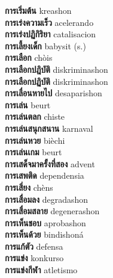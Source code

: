 \textbf{ การเริ่มต้น  } kreashon \\
\textbf{ การเร่งความเร็ว  } acelerando \\
\textbf{ การเร่งปฏิกิริยา  } catalisacion \\
\textbf{ การเลี้ยงเด็ก  } babysit (s.) \\
\textbf{ การเลือก  } chòis \\
\textbf{ การเลือกปฎิบัติ  } diskriminashon \\
\textbf{ การเลือกปฏิบัติ  } diskriminashon \\
\textbf{ การเลื่อนหายไป  } desaparishon \\
\textbf{ การเล่น  } beurt \\
\textbf{ การเล่นตลก  } chiste \\
\textbf{ การเล่นสนุกสนาน  } karnaval \\
\textbf{ การเล่นหวย  } bièchi \\
\textbf{ การเล่นเกม  } beurt \\
\textbf{ การเสด็จมาครั้งที่สอง  } advent \\
\textbf{ การเสพติด  } dependensia \\
\textbf{ การเสี่ยง  } chèns \\
\textbf{ การเสื่อมลง  } degradashon \\
\textbf{ การเสื่อมสลาย  } degenerashon \\
\textbf{ การเห็นชอบ  } aprobashon \\
\textbf{ การเห็นด้วย  } bindishoná \\
\textbf{ การแก้ตัว  } defensa \\
\textbf{ การแข่ง  } konkurso \\
\textbf{ การแข่งกีฬา  } atletismo \\

